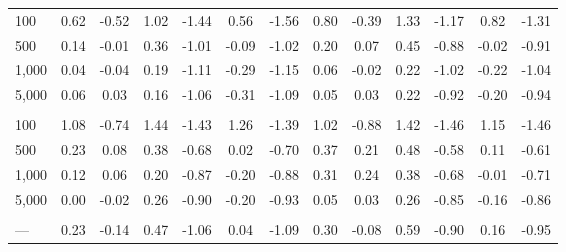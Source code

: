 \documentclass[AMA,STIX1COL,doublespace]{WileyNJD-v2}
\begin{document}
\begin{table}
\begin{tabular}[t]{lcccccccccccc}
\addlinespace[0.75em]
\multicolumn{13}{l}{\textbf{10 predictors, 40 junk}}\\
\hline
\hspace{1em}100 & 0.62 & -0.52 & 1.02 & -1.44 & 0.56 & -1.56 & 0.80 & -0.39 & 1.33 & -1.17 & 0.82 & -1.31\\
\hspace{1em}500 & 0.14 & -0.01 & 0.36 & -1.01 & -0.09 & -1.02 & 0.20 & 0.07 & 0.45 & -0.88 & -0.02 & -0.91\\
\hspace{1em}1,000 & 0.04 & -0.04 & 0.19 & -1.11 & -0.29 & -1.15 & 0.06 & -0.02 & 0.22 & -1.02 & -0.22 & -1.04\\
\hspace{1em}5,000 & 0.06 & 0.03 & 0.16 & -1.06 & -0.31 & -1.09 & 0.05 & 0.03 & 0.22 & -0.92 & -0.20 & -0.94\\
\addlinespace[0.75em]
\multicolumn{13}{l}{\textbf{10 predictors, 490 junk}}\\
\hline
\hspace{1em}100 & 1.08 & -0.74 & 1.44 & -1.43 & 1.26 & -1.39 & 1.02 & -0.88 & 1.42 & -1.46 & 1.15 & -1.46\\
\hspace{1em}500 & 0.23 & 0.08 & 0.38 & -0.68 & 0.02 & -0.70 & 0.37 & 0.21 & 0.48 & -0.58 & 0.11 & -0.61\\
\hspace{1em}1,000 & 0.12 & 0.06 & 0.20 & -0.87 & -0.20 & -0.88 & 0.31 & 0.24 & 0.38 & -0.68 & -0.01 & -0.71\\
\hspace{1em}5,000 & 0.00 & -0.02 & 0.26 & -0.90 & -0.20 & -0.93 & 0.05 & 0.03 & 0.26 & -0.85 & -0.16 & -0.86\\
\addlinespace[0.75em]
\multicolumn{13}{l}{\textbf{Overall}}\\
\hline
\hspace{1em}--- & 0.23 & -0.14 & 0.47 & -1.06 & 0.04 & -1.09 & 0.30 & -0.08 & 0.59 & -0.90 & 0.16 & -0.95\\
\bottomrule
\end{tabular}
\end{table}
\end{document}
